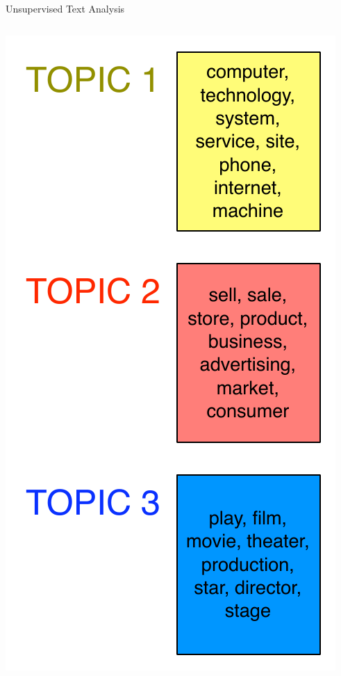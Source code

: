 

\begin{frame}{Unsupervised Text Analysis}

  \begin{columns}
       \begin{center}
         \includegraphics[width=.9\linewidth]{topic_models/nyt_topics}
       \end{center}
  \end{columns}


\end{frame}

